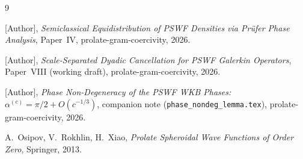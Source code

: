 \documentclass[12pt]{amsart}
\begin{document}
\begin{thebibliography}{9}

  [Author],
  \textit{Semiclassical Equidistribution of PSWF Densities
  via Pr\"ufer Phase Analysis},
  Paper~IV, prolate-gram-coercivity, 2026.

  [Author],
  \textit{Scale-Separated Dyadic Cancellation for PSWF
  Galerkin Operators},
  Paper~VIII (working draft), prolate-gram-coercivity, 2026.

  [Author],
  \textit{Phase Non-Degeneracy of the PSWF WKB Phases:
  $\alpha^{(c)} = \pi/2 + O(c^{-1/3})$},
  companion note (\texttt{phase\_nondeg\_lemma.tex}),
  prolate-gram-coercivity, 2026.

  A.~Osipov, V.~Rokhlin, H.~Xiao,
  \textit{Prolate Spheroidal Wave Functions of Order Zero},
  Springer, 2013.

\end{thebibliography}
\end{document}
